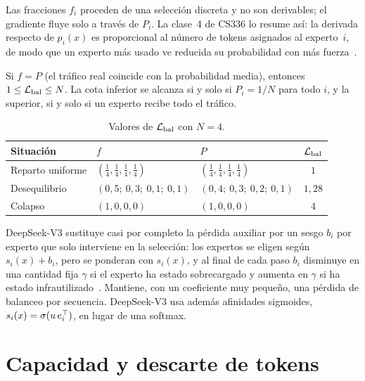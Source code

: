 Las fracciones $f_i$ proceden de una selección discreta y no son derivables; el gradiente fluye solo a través de $P_i$. La clase~4 de CS336 lo resume así: la derivada respecto de $p_i(x)$ es proporcional al número de tokens asignados al experto~$i$, de modo que un experto más usado ve reducida su probabilidad con más fuerza~\cite{cs336}.

\begin{teorema}\label{teo:bal}
Si $f=P$ (el tráfico real coincide con la probabilidad media), entonces $1\le\mathcal{L}_{\mathrm{bal}}\le N$. La cota inferior se alcanza si y solo si $P_i=1/N$ para todo $i$, y la superior, si y solo si un experto recibe todo el tráfico.
\end{teorema}

\begin{table}[ht]
\centering\small
\caption{Valores de $\mathcal{L}_{\mathrm{bal}}$ con $N=4$.}\label{tab:bal}
\begin{tabular}{@{}lllc@{}}
\toprule
Situación & $f$ & $P$ & $\mathcal{L}_{\mathrm{bal}}$ \\
\midrule
Reparto uniforme & $(\frac14,\frac14,\frac14,\frac14)$ & $(\frac14,\frac14,\frac14,\frac14)$ & $1$ \\
Desequilibrio & $(0{,}5;\ 0{,}3;\ 0{,}1;\ 0{,}1)$ & $(0{,}4;\ 0{,}3;\ 0{,}2;\ 0{,}1)$ & $1{,}28$ \\
Colapso & $(1,0,0,0)$ & $(1,0,0,0)$ & $4$ \\
\bottomrule
\end{tabular}
\end{table}

\begin{observacion}
DeepSeek-V3 sustituye casi por completo la pérdida auxiliar por un sesgo $b_i$ por experto que solo interviene en la selección: los expertos se eligen según $s_i(x)+b_i$, pero se ponderan con $s_i(x)$, y al final de cada paso $b_i$ disminuye en una cantidad fija $\gamma$ si el experto ha estado sobrecargado y aumenta en $\gamma$ si ha estado infrautilizado~\cite[§2.1.2]{deepseekv3}. Mantiene, con un coeficiente muy pequeño, una pérdida de balanceo por secuencia. DeepSeek-V3 usa además afinidades sigmoides, $s_i(x)=\sigma(u\,e_i^{\top})$, en lugar de una softmax.
\end{observacion}

\section{Capacidad y descarte de tokens}

